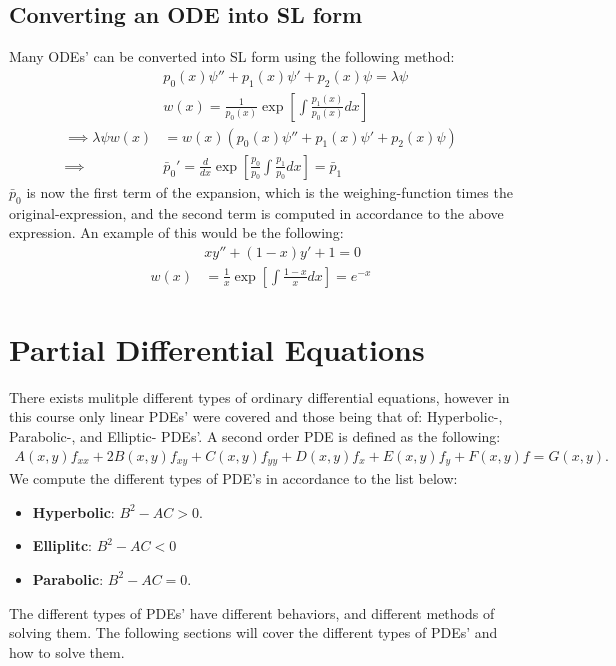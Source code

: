 \documentclass[12pt]{article}
\begin{document}
\subsection{Converting an ODE into SL form}
Many ODEs' can be converted into SL form using the following method:
\begin{align*}
    &p_0(x)\psi'' + p_1(x)\psi' + p_2(x)\psi = \lambda \psi\\
    &w(x)= \frac{1}{p_0(x)}\exp\left[\int \frac{p_1(x)}{p_0(x)}dx\right]\\
    \implies \lambda \psi w(x) &= w(x)\left(p_0(x)\psi'' + p_1(x)\psi' + p_2(x)\psi\right)\\
    \implies& \bar{p}_0' = \frac{d}{dx}\exp\left[\frac{p_0}{p_0}\int\frac{p_1}{p_0}dx\right]=\bar{p}_1
\end{align*}$\bar{p}_0$ is now the first term of the expansion, which is the weighing-function times the original-expression, and the second term is computed in accordance to the above expression. An example of this would be the following:
\begin{align*}
    &xy'' + (1-x)y' + 1 = 0\\
    w(x)&= \frac{1}{x}\exp[\int\frac{1-x}{x}dx] = e^{-x}
\end{align*}

\section{Partial Differential Equations}
There exists mulitple different types of ordinary differential equations, however in this course only linear PDEs' were covered and those being that of: Hyperbolic-, Parabolic-, and Elliptic- PDEs'. A second order PDE is defined as the following:
\begin{align}
    A(x,y)f_{xx} + 2B(x,y)f_{xy} + C(x,y)f_{yy} + D(x,y)f_x + E(x,y)f_y + F(x,y)f = G(x,y).\label{eq: general PDE of second order}
\end{align}We compute the different types of PDE's in accordance to the list below:
\begin{itemize}
    \item \textbf{Hyperbolic}: $B^2 - AC > 0$.
    \item \textbf{Elliplitc}: $B^2 - AC < 0$ 
    \item \textbf{Parabolic}: $B^2 - AC = 0$.
\end{itemize}The different types of PDEs' have different behaviors, and different methods of solving them. The following sections will cover the different types of PDEs' and how to solve them.
\end{document}
